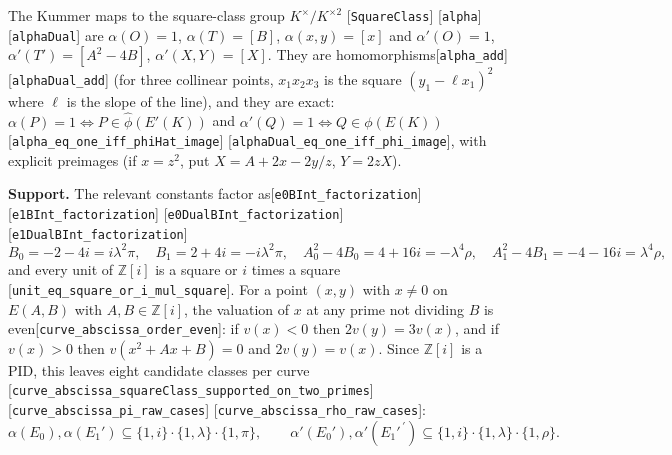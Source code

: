 \documentclass[10pt]{article}
\theoremstyle{definition}
\theoremstyle{remark}
\newcommand{\Z}{\mathbb{Z}}
\newcommand{\lam}{\lambda}
\newcommand{\pisym}{\pi}
\newcommand{\rhosym}{\rho}
\newcommand{\Oinf}{O}
\newcommand{\leanref}[1]{{\scriptsize\textup{[\texttt{#1}]}}\allowbreak}
\begin{document}
The Kummer maps to the square-class group $K^\times/K^{\times2}$
\leanref{Square\allowbreak Class} \leanref{alpha} \leanref{alpha\allowbreak Dual} are
$\alpha(\Oinf)=1$, $\alpha(T)=[B]$, $\alpha(x,y)=[x]$ and
$\alpha'(\Oinf)=1$, $\alpha'(T')=[A^2-4B]$, $\alpha'(X,Y)=[X]$.
They are homomorphisms\leanref{alpha\_\allowbreak add} \leanref{alpha\allowbreak Dual\_\allowbreak add} (for three
collinear points, $x_1x_2x_3$ is the square $(y_1-\ell x_1)^2$ where $\ell$ is
the slope of the line), and they are exact:
$\alpha(P)=1\iff P\in\hat\phi(E'(K))$ and $\alpha'(Q)=1\iff Q\in\phi(E(K))$
\leanref{alpha\_\allowbreak eq\_\allowbreak one\_\allowbreak iff\_\allowbreak phi\allowbreak Hat\_\allowbreak image} \leanref{alpha\allowbreak Dual\_\allowbreak eq\_\allowbreak one\_\allowbreak iff\_\allowbreak phi\_\allowbreak image},
with explicit preimages (if $x=z^2$, put $X=A+2x-2y/z$, $Y=2zX$).

\medskip\noindent\textbf{Support.}
The relevant constants factor as\leanref{e0\allowbreak BInt\_\allowbreak factorization} \leanref{e1\allowbreak BInt\_\allowbreak factorization} \leanref{e0\allowbreak Dual\allowbreak BInt\_\allowbreak factorization} \leanref{e1\allowbreak Dual\allowbreak BInt\_\allowbreak factorization}
\[
 B_0=-2-4i=i\lam^2\pisym,\quad B_1=2+4i=-i\lam^2\pisym,\quad
 A_0^2-4B_0=4+16i=-\lam^4\rhosym,\quad A_1^2-4B_1=-4-16i=\lam^4\rhosym,
\]
and every unit of $\Z[i]$ is a square or $i$ times a square
\leanref{unit\_\allowbreak eq\_\allowbreak square\_\allowbreak or\_\allowbreak i\_\allowbreak mul\_\allowbreak square}.  For a point $(x,y)$ with $x\ne0$
on $E(A,B)$ with $A,B\in\Z[i]$, the valuation of $x$ at any prime not dividing
$B$ is even\leanref{curve\_\allowbreak abscissa\_\allowbreak order\_\allowbreak even}: if $v(x)<0$ then
$2v(y)=3v(x)$, and if $v(x)>0$ then $v(x^2+Ax+B)=0$ and $2v(y)=v(x)$.
Since $\Z[i]$ is a PID, this leaves eight candidate classes per curve
\leanref{curve\_\allowbreak abscissa\_\allowbreak square\allowbreak Class\_\allowbreak supported\_\allowbreak on\_\allowbreak two\_\allowbreak primes} \leanref{curve\_\allowbreak abscissa\_\allowbreak pi\_\allowbreak raw\_\allowbreak cases} \leanref{curve\_\allowbreak abscissa\_\allowbreak rho\_\allowbreak raw\_\allowbreak cases}:
\[
 \alpha(E_0),\alpha(E_1')\subseteq\{1,i\}\cdot\{1,\lam\}\cdot\{1,\pisym\},\qquad
 \alpha'(E_0'),\alpha'(E_1'^{\,\prime})\subseteq\{1,i\}\cdot\{1,\lam\}\cdot\{1,\rhosym\}.
\]
\end{document}
